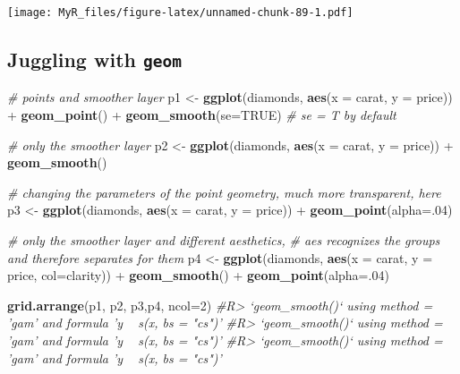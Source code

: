 \documentclass[]{book}
\newenvironment{Shaded}{}{}
\newcommand{\CommentTok}[1]{\textcolor[rgb]{0.38,0.63,0.69}{\textit{#1}}}
\newcommand{\DataTypeTok}[1]{\textcolor[rgb]{0.56,0.13,0.00}{#1}}
\newcommand{\DecValTok}[1]{\textcolor[rgb]{0.25,0.63,0.44}{#1}}
\newcommand{\KeywordTok}[1]{\textcolor[rgb]{0.00,0.44,0.13}{\textbf{#1}}}
\newcommand{\NormalTok}[1]{#1}
\newcommand{\OperatorTok}[1]{\textcolor[rgb]{0.40,0.40,0.40}{#1}}
\newcommand{\OtherTok}[1]{\textcolor[rgb]{0.00,0.44,0.13}{#1}}
\newcommand{\StringTok}[1]{\textcolor[rgb]{0.25,0.44,0.63}{#1}}
\theoremstyle{definition}
\theoremstyle{definition}
\theoremstyle{definition}
\theoremstyle{remark}
\begin{document}
\texttt{[image: MyR\_files/figure-latex/unnamed-chunk-89-1.pdf]}

\hypertarget{juggling-with-geom}{%
\subsection{\texorpdfstring{Juggling with
\texttt{geom}}{Juggling with geom}}\label{juggling-with-geom}}

\begin{Shaded}
\begin{Highlighting}[]
\CommentTok{# points and smoother layer}
\NormalTok{p1 <-}\StringTok{ }\KeywordTok{ggplot}\NormalTok{(diamonds, }\KeywordTok{aes}\NormalTok{(}\DataTypeTok{x =}\NormalTok{ carat, }\DataTypeTok{y =}\NormalTok{ price)) }\OperatorTok{+}\StringTok{ }
\StringTok{      }\KeywordTok{geom_point}\NormalTok{() }\OperatorTok{+}\StringTok{ }
\StringTok{      }\KeywordTok{geom_smooth}\NormalTok{(}\DataTypeTok{se=}\OtherTok{TRUE}\NormalTok{) }\CommentTok{# se = T by default}

\CommentTok{# only the smoother layer}
\NormalTok{p2 <-}\StringTok{ }\KeywordTok{ggplot}\NormalTok{(diamonds, }\KeywordTok{aes}\NormalTok{(}\DataTypeTok{x =}\NormalTok{ carat, }\DataTypeTok{y =}\NormalTok{ price)) }\OperatorTok{+}\StringTok{ }
\StringTok{      }\KeywordTok{geom_smooth}\NormalTok{()}

\CommentTok{# changing the parameters of the point geometry, much more transparent, here}
\NormalTok{p3 <-}\StringTok{ }\KeywordTok{ggplot}\NormalTok{(diamonds, }\KeywordTok{aes}\NormalTok{(}\DataTypeTok{x =}\NormalTok{ carat, }\DataTypeTok{y =}\NormalTok{ price)) }\OperatorTok{+}\StringTok{ }
\StringTok{      }\KeywordTok{geom_point}\NormalTok{(}\DataTypeTok{alpha=}\NormalTok{.}\DecValTok{04}\NormalTok{)}

\CommentTok{# only the smoother layer and different aesthetics,}
\CommentTok{# aes recognizes the groups and therefore separates for them}
\NormalTok{p4 <-}\StringTok{ }\KeywordTok{ggplot}\NormalTok{(diamonds, }\KeywordTok{aes}\NormalTok{(}\DataTypeTok{x =}\NormalTok{ carat, }\DataTypeTok{y =}\NormalTok{ price, }\DataTypeTok{col=}\NormalTok{clarity)) }\OperatorTok{+}
\StringTok{      }\KeywordTok{geom_smooth}\NormalTok{() }\OperatorTok{+}\StringTok{ }\KeywordTok{geom_point}\NormalTok{(}\DataTypeTok{alpha=}\NormalTok{.}\DecValTok{04}\NormalTok{)}

\KeywordTok{grid.arrange}\NormalTok{(p1, p2, p3,p4,  }\DataTypeTok{ncol=}\DecValTok{2}\NormalTok{)}
\CommentTok{#R> `geom_smooth()` using method = 'gam' and formula 'y ~ s(x, bs = "cs")'}
\CommentTok{#R> `geom_smooth()` using method = 'gam' and formula 'y ~ s(x, bs = "cs")'}
\CommentTok{#R> `geom_smooth()` using method = 'gam' and formula 'y ~ s(x, bs = "cs")'}
\end{Highlighting}
\end{Shaded}
\end{document}
